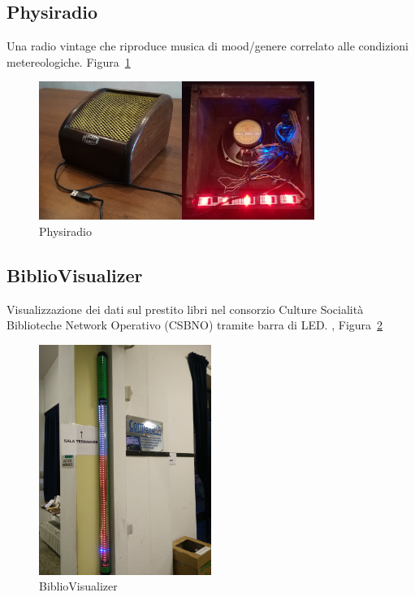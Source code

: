 \documentclass[12pt,a4paper]{report}
\begin{document}

\subsection{Physiradio}
Una radio vintage che riproduce musica di mood/genere correlato alle condizioni metereologiche. Figura~\ref{fig:physiradio}
\begin{figure}[h]
  \centering
  \includegraphics[width=0.8\textwidth]{physiradio}
  \caption{Physiradio \cite{physiradio}}
  \label{fig:physiradio}
\end{figure}

\subsection{BiblioVisualizer}
Visualizzazione dei dati sul prestito libri nel consorzio Culture Socialità Biblioteche Network Operativo (CSBNO) tramite barra di LED.
\cite{bibliovisgitlab}, Figura~\ref{fig:bibliovisualizer}
\begin{figure}[h]
  \centering
  \includegraphics[width=0.5\textwidth]{bibliovisualizer}
  \caption{BiblioVisualizer}
  \label{fig:bibliovisualizer}
\end{figure}
\end{document}
